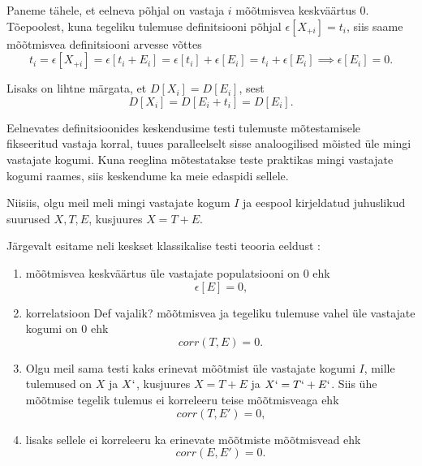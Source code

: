 \documentclass[a4paper]{article}
\numberwithin{equation}{section}
\theoremstyle{definition}
\begin{document}
Paneme tähele, et eelneva põhjal on vastaja $i$ mõõtmisvea keskväärtus $0$. Tõepoolest, kuna tegeliku tulemuse definitsiooni põhjal $\epsilon \left[ X_{+i} \right] = t_i$, siis saame mõõtmisvea definitsiooni arvesse võttes 
\begin{equation*}
 t_i = \epsilon \left[ X_{+i} \right] = \epsilon \left[ t_i + E_i \right] = \epsilon \left[ t_i \right] + \epsilon \left[ E_i \right] = t_i + \epsilon \left[ E_i \right] \implies \epsilon \left[ E_i \right] = 0 \text{.}
\end{equation*}

Lisaks on lihtne märgata, et  $D \left[ X_i \right] = D \left[ E_i \right]$, sest 
\begin{equation*}
D \left[ X_i \right] = D \left[ E_i + t_i \right] = D \left[ E_i \right] \text{.}
\end{equation*}  

Eelnevates definitsioonides keskendusime testi tulemuste mõtestamisele fikseeritud vastaja korral, tuues paralleelselt sisse analoogilised mõisted \"ule mingi vastajate kogumi. Kuna reeglina mõtestatakse teste praktikas mingi vastajate kogumi raames, siis keskendume ka meie edaspidi sellele.

Niisiis, olgu meil meli mingi vastajate kogum $I$ ja eespool kirjeldatud juhuslikud suurused $X,T,E$, kusjuures $X = T + E$.


Järgevalt esitame neli keskset klassikalise testi teooria eeldust \cite[10]{DeGruijter2005}:
\begin{enumerate}[I]
\item mõõtmisvea keskväärtus \"ule vastajate populatsiooni on 0 ehk 
\begin{equation*}
\epsilon \left[ E \right] = 0 \text{,}
\end{equation*}
\item korrelatsioon {\color{cyan} Def vajalik?} mõõtmisvea ja tegeliku tulemuse vahel \"ule vastajate kogumi on $0$ ehk
\begin{equation*}
corr \left( T, E \right) = 0 \text{.}
\end{equation*} 
\item Olgu meil sama testi kaks erinevat mõõtmist \"ule vastajate kogumi $I$, mille tulemused on $X$ ja $X`$, kusjuures $X = T + E$ ja $X` = T` + E`$. Siis \"uhe mõõtmise tegelik tulemus ei korreleeru teise mõõtmisveaga ehk
\begin{equation*}
corr \left( T, E' \right) = 0 \text{,}
\end{equation*}   
\item lisaks sellele ei korreleeru ka erinevate mõõtmiste mõõtmisvead ehk
\begin{equation*}
corr \left( E, E' \right) = 0 \text{.}
\end{equation*}
\end{enumerate}
\end{document}
